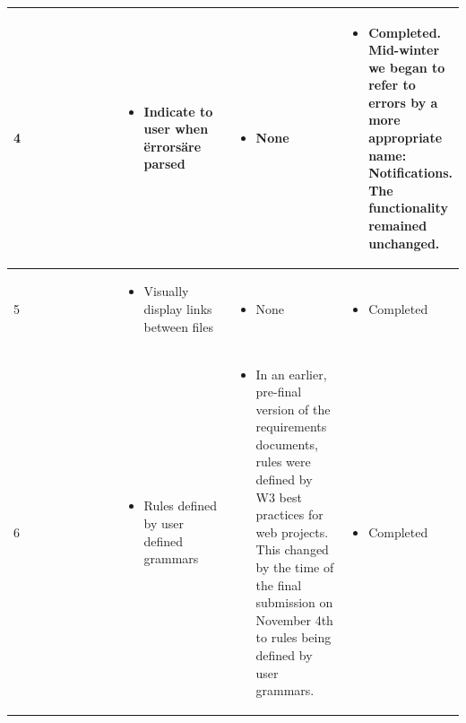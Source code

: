 \documentclass[letterpaper,10pt,titlepage,draftclsnofoot,onecolumn,onesided] {IEEEtran}
\begin{document}
{\begin{center}
\begin{singlespace}
\begin{tabular}{ |  p{0.25\linewidth}  |  p{0.25\linewidth}  | p{0.25\linewidth} | p{0.25\linewidth} |}
        \\ \hline

            4
		& 
			\begin{itemize}
				\item Indicate to user when \"errors\" are parsed
			\end{itemize}
		& 
			\begin{itemize}
				\item None
			\end{itemize}
		&
			\begin{itemize}
				\item Completed. Mid-winter we began to refer to errors by a more appropriate name: Notifications. 
                The functionality remained unchanged.
			\end{itemize} 
		
        \\ \hline

        	5
		& 
			\begin{itemize}
				\item Visually display links between files
			\end{itemize}
		& 
			\begin{itemize}
				\item None
			\end{itemize}
		&
			\begin{itemize}
				\item Completed
			\end{itemize} 
		
        \\ \hline

        	6
		& 
			\begin{itemize}
				\item Rules defined by user defined grammars
			\end{itemize}
		& 
			\begin{itemize}
				\item In an earlier, pre-final version of the requirements documents, rules were defined by W3 best practices for web projects.
                This changed by the time of the final submission on November 4th to rules being defined by user grammars.
			\end{itemize}
		&
			\begin{itemize}
				\item Completed
			\end{itemize} 
		
        \\ \hline


\end{tabular}
\end{singlespace}
\end{center}}
\end{document}
